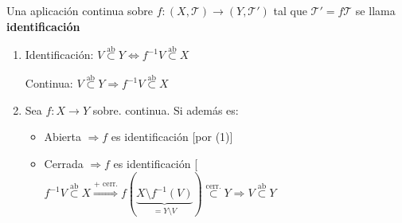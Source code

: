 \begin{defi}
Una aplicación continua sobre $f: \left( X, \mathcal{T} \right) \rightarrow \left( Y, \mathcal{T}' \right)$ tal que $\mathcal{T}' = f\mathcal{T}$ se llama \textbf{identificación} 
\end{defi}

\begin{obs}
\begin{enumerate}
    \item Identificación: $V \stackrel{\text{ab}}{\subset} Y \Leftrightarrow f^{-1}V \stackrel{\text{ab}}{\subset} X$

    Continua: $V \stackrel{\text{ab}}{\subset } Y \Rightarrow f^{-1}V \stackrel{\text{ab}}{\subset} X$

    \item Sea $f: X \rightarrow Y$ sobre. continua. Si además es:
    \begin{itemize}
        \item Abierta $\Rightarrow f$ es identificación [por (1)]
        \item Cerrada $\Rightarrow f$ es identificación [$f^{-1}V \stackrel{\text{ab}}{\subset} X \stackrel{\text{+ cerr.}}{\Rightarrow} f\left( \underbrace{X \setminus f^{-1}\left( V \right)}_{= Y\setminus V} \right) \stackrel{\text{cerr.}}{\subset} Y \Rightarrow V \stackrel{\text{ab}}{\subset} Y$
    \end{itemize}
\end{enumerate}
\end{obs}

